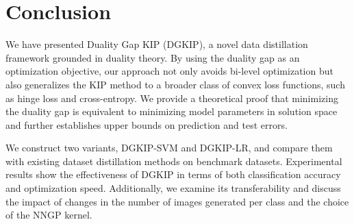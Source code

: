 \section{Conclusion}
\label{Conclusion}

We have presented Duality Gap KIP (DGKIP), a novel data distillation framework grounded in duality theory. By using the duality gap as an optimization objective, our approach not only avoids bi-level optimization but also generalizes the KIP method to a broader class of convex loss functions, such as hinge loss and cross-entropy. We provide a theoretical proof that minimizing the duality gap is equivalent to minimizing model parameters in solution space and further establishes upper bounds on prediction and test errors.

We construct two variants, DGKIP-SVM and DGKIP-LR, and compare them with existing dataset distillation methods on benchmark datasets. Experimental results show the effectiveness of DGKIP in terms of both classification accuracy and optimization speed. Additionally, we examine its transferability and discuss the impact of changes in the number of images generated per class and the choice of the NNGP kernel.


